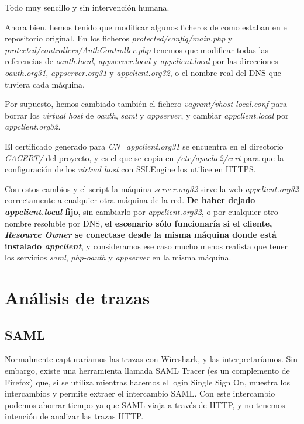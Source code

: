 \documentclass[]{article}
\begin{document}
Todo muy sencillo y sin intervención humana.


\hfill


Ahora bien, hemos tenido que modificar algunos ficheros de como estaban en el repositorio original. En los ficheros \textit{protected/config/main.php} y \textit{protected/controllers/AuthController.php} tenemos que modificar todas las referencias de \textit{oauth.local}, \textit{appserver.local} y \textit{appclient.local} por las direcciones \textit{oauth.org31}, \textit{appserver.org31} y \textit{appclient.org32}, o el nombre real del DNS que tuviera cada máquina.

Por supuesto, hemos cambiado también el fichero \textit{vagrant/vhost-local.conf} para borrar los \textit{virtual host} de \textit{oauth}, \textit{saml} y \textit{appserver}, y cambiar \textit{appclient.local} por \textit{appclient.org32}.

\hfill

El certificado generado para \textit{CN=appclient.org31} se encuentra en el directorio \textit{CACERT/} del proyecto, y es el que se copia en \textit{/etc/apache2/cert} para que la configuración de los \textit{virtual host} con SSLEngine los utilice en HTTPS.



\hfill


Con estos cambios y el script la máquina \textit{server.org32} sirve la web \textit{appclient.org32} correctamente a cualquier otra máquina de la red. \textbf{De haber dejado \textit{appclient.local} fijo}, sin cambiarlo por \textit{appclient.org32}, o por cualquier otro nombre resoluble por DNS, \textbf{el escenario sólo funcionaría si el cliente, \textit{Resource Owner} se conectase desde la misma máquina donde está instalado \textit{appclient}}, y consideramos ese caso mucho menos realista que tener los servicios \textit{saml}, \textit{php-oauth} y \textit{appserver} en la misma máquina.



\section{Análisis de trazas}

\subsection{SAML}

Normalmente capturaríamos las trazas con Wireshark, y las interpretaríamos. Sin embargo, existe una herramienta llamada SAML Tracer (es un complemento de Firefox) que, si se utiliza mientras hacemos el login Single Sign On, muestra los intercambios y permite extraer el intercambio SAML. Con este intercambio podemos ahorrar tiempo ya que SAML viaja a través de HTTP, y no tenemos intención de analizar las trazas HTTP.
\end{document}
